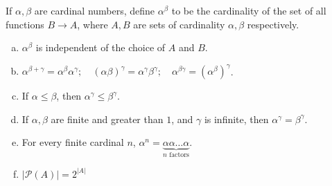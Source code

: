 \begin{exercise}
    If $\alpha,\beta$ are cardinal numbers, define $\alpha^\beta$ to be the cardinality of the set of all functions $B\to A$, where $A,B$ are sets of cardinality $\alpha,\beta$ respectively.
    \begin{enumerate}[(a)]
        \item $\alpha^\beta$ is independent of the choice of $A$ and $B$.
        \item $\alpha^{\beta+\gamma} = \alpha^\beta \alpha^\gamma;\quad (\alpha\beta)^\gamma = \alpha^\gamma \beta^\gamma;\quad \alpha^{\beta\gamma} = (\alpha^\beta)^\gamma$.
        \item If $\alpha\le \beta$, then $\alpha^\gamma\le \beta^\gamma$.
        \item If $\alpha,\beta$ are finite and greater than $1$, and $\gamma$ is infinite, then $\alpha^\gamma = \beta^\gamma$.
        \item For every finite cardinal $n$, $\alpha^n = \underbrace{\alpha\alpha\dots\alpha}_{\text{$n$ factors}}$.
        \item $|\mathcal{P}(A)| = 2^{|A|}$
    \end{enumerate}
\end{exercise}
